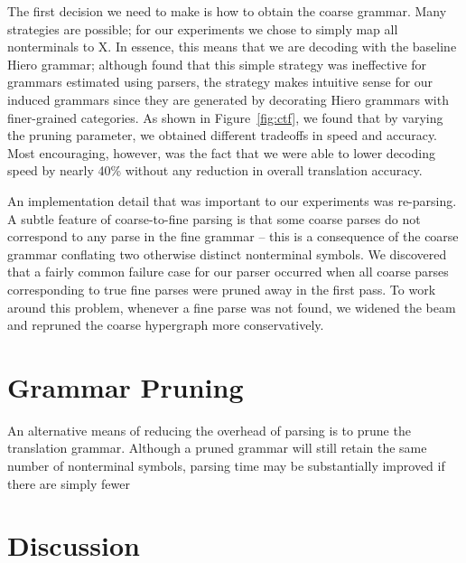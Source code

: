 The first decision we need to make is how to obtain the coarse grammar.  Many strategies are possible; for our experiments we chose to simply map all nonterminals to X.  In essence, this means that we are decoding with the baseline Hiero grammar; although \citet{denero-EtAl:2009:NAACLHLT09} found that this simple strategy was ineffective for grammars estimated using parsers, the strategy makes intuitive sense for our induced grammars since they are generated by decorating Hiero grammars with finer-grained categories.  As shown in Figure~\ref{fig:ctf}, we found that by varying the pruning parameter, we obtained different tradeoffs in speed and accuracy.  Most encouraging, however, was the fact that we were able to lower decoding speed by nearly 40\% without any reduction in overall translation accuracy.

An implementation detail that was important to our experiments was re-parsing.  A subtle feature of coarse-to-fine parsing is that some coarse parses do not correspond to any parse in the fine grammar -- this is a consequence of the coarse grammar conflating two otherwise distinct nonterminal symbols.  We discovered that a fairly common failure case for our parser occurred when all coarse parses corresponding to true fine parses were pruned away in the first pass.  To work around this problem, whenever a fine parse was not found, we widened the beam and repruned the coarse hypergraph more conservatively.

\section{Grammar Pruning}\label{sec:pruning}

An alternative means of reducing the overhead of parsing is to prune the translation grammar.  Although a pruned grammar will still retain the same number of nonterminal symbols, parsing time may be substantially improved if there are simply fewer 

\section{Discussion}





